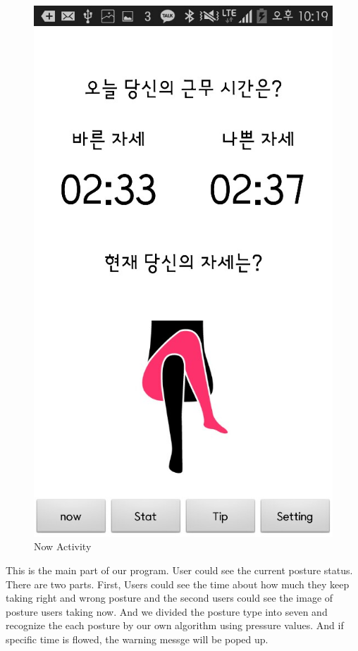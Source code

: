\documentclass[conference]{IEEEtran}
\begin{document}
\begin{figure}[H]
\begin{center}
    \includegraphics[scale=0.4]{now}
    \caption{Now Activity} 
\end{center}
\end{figure}

This is the main part of our program. User could see the current posture status. There are two parts. First, Users could see the time about how much they keep taking right and wrong posture and the second users could see the image of posture users taking now. And we divided the posture type into seven and recognize the each posture by our own algorithm using pressure values. And  if specific time is flowed, the warning messge will be poped up.
\end{document}
